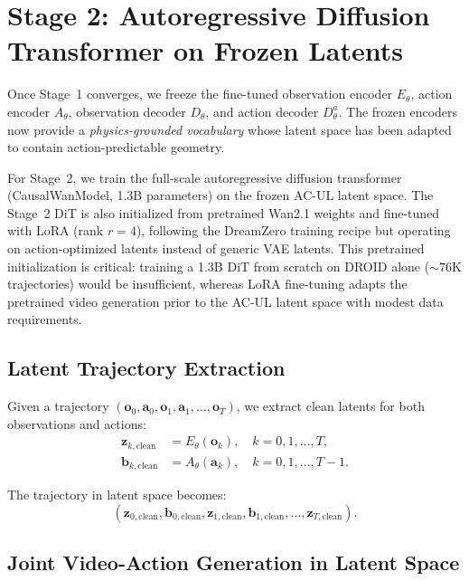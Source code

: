 \documentclass{article}
\newcommand{\vo}{\bm{o}}
\newcommand{\vz}{\bm{z}}
\newcommand{\va}{\bm{a}}
\newcommand{\vb}{\bm{b}}
\begin{document}
\section{Stage 2: Autoregressive Diffusion Transformer on Frozen Latents}
\label{sec:stage2}

Once Stage~1 converges, we freeze the fine-tuned observation encoder $E_\theta$, action encoder $A_\theta$, observation decoder $D_\theta$, and action decoder $D_\theta^a$. The frozen encoders now provide a \emph{physics-grounded vocabulary} whose latent space has been adapted to contain action-predictable geometry.

For Stage~2, we train the full-scale autoregressive diffusion transformer (CausalWanModel, 1.3B parameters) on the frozen AC-UL latent space.
The Stage~2 DiT is also initialized from pretrained Wan2.1 weights and fine-tuned with LoRA (rank $r = 4$), following the DreamZero training recipe but operating on action-optimized latents instead of generic VAE latents.
This pretrained initialization is critical: training a 1.3B DiT from scratch on DROID alone (${\sim}76$K trajectories) would be insufficient, whereas LoRA fine-tuning adapts the pretrained video generation prior to the AC-UL latent space with modest data requirements.

\subsection{Latent Trajectory Extraction}

Given a trajectory $(\vo_0, \va_0, \vo_1, \va_1, \ldots, \vo_T)$, we extract clean latents for both observations and actions:
\begin{align}
  \vz_{k,\text{clean}} &= E_\theta(\vo_k), \quad k = 0, 1, \ldots, T, \label{eq:latent_extract} \\
  \vb_{k,\text{clean}} &= A_\theta(\va_k), \quad k = 0, 1, \ldots, T-1. \label{eq:action_latent_extract}
\end{align}

The trajectory in latent space becomes:
\begin{equation}
  (\vz_{0,\text{clean}}, \vb_{0,\text{clean}}, \vz_{1,\text{clean}}, \vb_{1,\text{clean}}, \ldots, \vz_{T,\text{clean}}).
  \label{eq:latent_trajectory}
\end{equation}

\subsection{Joint Video-Action Generation in Latent Space}
\end{document}
